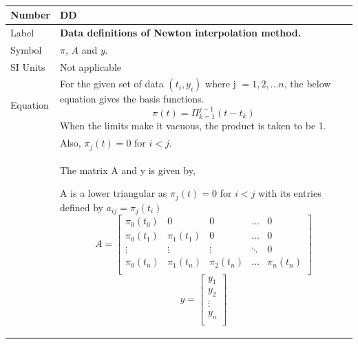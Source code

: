 \documentclass[12pt]{article}
\newcommand{\colAwidth}{0.13\textwidth}
\newcommand{\colBwidth}{0.82\textwidth}
\newcounter{defnum} %
\newcounter{datadefnum} %
\begin{document}
~\newline
\noindent
\begin{minipage}{\textwidth}
	\renewcommand*{\arraystretch}{1.5}
	\begin{tabular}{| p{\colAwidth} | p{\colBwidth}|}
		\hline
		\rowcolor[gray]{0.9}
		Number
		& DD{datadefnum}\thedatadefnum \label{DD_Newton}\\
		\hline
		
		Label
		& \bf Data definitions of Newton interpolation method.\\
		\hline
		
		Symbol 
		&$\pi$, $A$ and $y$.\\
		\hline
		
		SI Units 
		& Not applicable\\
		\hline
		
		Equation
		&For the given set of data $(t_i, y_i)$ where j $= {1,2,...n}$, the below equation gives the basis functions.
		\begin{equation*}
		\pi(t) = \Pi_{k=1}^{j-1} (t - t_k)  
		\end{equation*}
		When the limits make it vacuous, the product is taken to be 1.\\
		& Also, $\pi_j (t) = 0$ for $i < j$.
		\\
		&The matrix A and y is given by,
		
		A is a lower triangular as $\pi_j (t) = 0$ for $i < j$ with its entries defined by $a_{ij} = \pi_j (t_i)$
		\begin{equation*}
		A = \begin{bmatrix}
		\pi_0 (t_0) & 0           & 0            & \dots         & 0 \\
		
		\pi_0 (t_1) & \pi_1 (t_1) & 0            & \dots         & 0 \\
		\vdots      & \vdots      & \vdots       &\ddots         & 0 \\
		\pi_0 (t_n) & \pi_1 (t_n) & \pi_2 (t_n)  & \dots         & \pi_n (t_n) \\
		\end{bmatrix}
		\end{equation*}
		\begin{equation*}
		y = \begin{bmatrix}
		y_1  \\
		y_2 \\
		\vdots \\
		y_n \\
		\end{bmatrix} 
		\end{equation*} \\
		\hline
		

\end{tabular}
\end{minipage}
\end{document}
